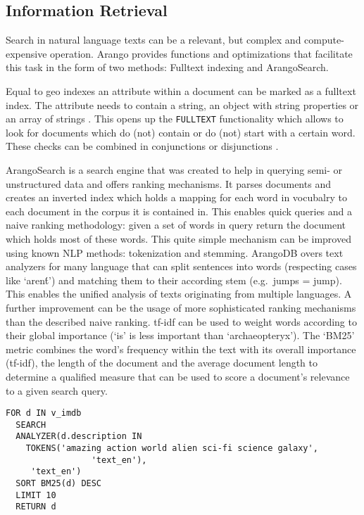 \subsection{Information Retrieval}

Search in natural language texts can be a relevant, but complex and compute-expensive operation. Arango provides functions and optimizations that facilitate this task in the form of two methods: Fulltext indexing and ArangoSearch.

Equal to geo indexes an attribute within a document can be marked as a fulltext index. The attribute needs to contain a string, an object with string properties or an array of strings \cite{FulltextIndex}. This opens up the \texttt{FULLTEXT} functionality which allows to look for documents which do (not) contain or do (not) start with a certain word. These checks can be combined in conjunctions or disjunctions \cite{FulltextFunc}.

ArangoSearch is a search engine that was created to help in querying semi- or unstructured data and offers ranking mechanisms. It parses documents and creates an inverted index which holds a mapping for each word in vocubalry to each document in the corpus it is contained in. This enables quick queries and a naive ranking methodology: given a set of words in query return the document which holds most of these words.
This quite simple mechanism can be improved using known NLP methods: tokenization and stemming. ArangoDB overs text analyzers for many language that can split sentences into words (respecting cases like `aren\'t') and matching them to their according stem (e.g.\ jumps = jump). This enables the unified analysis of texts originating from multiple languages.
A further improvement can be the usage of more sophisticated ranking mechanisms than the described naive ranking. \gls{tf-idf} can be used to weight words according to their global importance (`is' is less important than `archaeopteryx').
The `BM25' metric combines the word's frequency within the text with its overall importance (\gls{tf-idf}), the length of the document and the average document length to determine a qualified measure that can be used to score a document's relevance to a given search query. \cite{ArangoSearchTut}

\begin{lstlisting}[language=ArangoQL,caption={Searching a database of movie descriptions}]
FOR d IN v_imdb 
  SEARCH 
  ANALYZER(d.description IN 
    TOKENS('amazing action world alien sci-fi science galaxy', 
                 'text_en'),
     'text_en')
  SORT BM25(d) DESC 
  LIMIT 10 
  RETURN d
\end{lstlisting}

